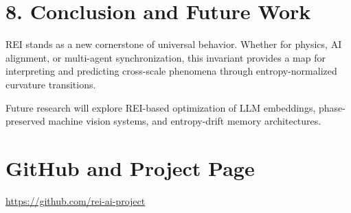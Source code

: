 \documentclass[12pt]{article}
\begin{document}
\section{8. Conclusion and Future Work}

REI stands as a new cornerstone of universal behavior. Whether for physics, AI alignment, or multi-agent synchronization, this invariant provides a map for interpreting and predicting cross-scale phenomena through entropy-normalized curvature transitions.

Future research will explore REI-based optimization of LLM embeddings, phase-preserved machine vision systems, and entropy-drift memory architectures.

\section*{GitHub and Project Page}

\url{https://github.com/rei-ai-project}
\end{document}
